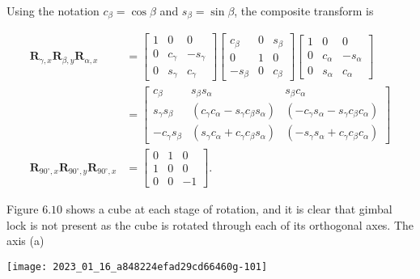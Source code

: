 Using the notation $c_{\beta}=\cos \beta$ and $s_{\beta}=\sin \beta$, the composite transform is

$$
\begin{aligned}
\mathbf{R}_{\gamma, x} \mathbf{R}_{\beta, y} \mathbf{R}_{\alpha, x} & =\left[\begin{array}{ccc}
1 & 0 & 0 \\
0 & c_{\gamma} & -s_{\gamma} \\
0 & s_{\gamma} & c_{\gamma}
\end{array}\right]\left[\begin{array}{ccc}
c_{\beta} & 0 & s_{\beta} \\
0 & 1 & 0 \\
-s_{\beta} & 0 & c_{\beta}
\end{array}\right]\left[\begin{array}{ccc}
1 & 0 & 0 \\
0 & c_{\alpha} & -s_{\alpha} \\
0 & s_{\alpha} & c_{\alpha}
\end{array}\right] \\
& =\left[\begin{array}{ccc}
c_{\beta} & s_{\beta} s_{\alpha} & s_{\beta} c_{\alpha} \\
s_{\gamma} s_{\beta} & \left(c_{\gamma} c_{\alpha}-s_{\gamma} c_{\beta} s_{\alpha}\right) & \left(-c_{\gamma} s_{\alpha}-s_{\gamma} c_{\beta} c_{\alpha}\right) \\
-c_{\gamma} s_{\beta} & \left(s_{\gamma} c_{\alpha}+c_{\gamma} c_{\beta} s_{\alpha}\right) & \left(-s_{\gamma} s_{\alpha}+c_{\gamma} c_{\beta} c_{\alpha}\right)
\end{array}\right] \\
\mathbf{R}_{90^{\circ}, x} \mathbf{R}_{90^{\circ}, y} \mathbf{R}_{90^{\circ}, x} & =\left[\begin{array}{ccc}
0 & 1 & 0 \\
1 & 0 & 0 \\
0 & 0 & -1
\end{array}\right] .
\end{aligned}
$$

Figure $6.10$ shows a cube at each stage of rotation, and it is clear that gimbal lock is not present as the cube is rotated through each of its orthogonal axes. The axis (a)

\begin{center}
\texttt{[image: 2023\_01\_16\_a848224efad29cd66460g-101]}
\end{center}

